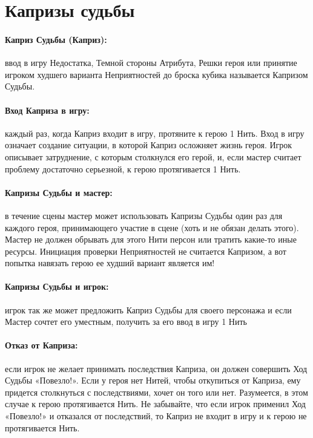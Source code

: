 \section{Капризы судьбы}
\paragraph{Каприз Судьбы (Каприз):} ввод в игру Недостатка, Темной стороны Атрибута, Решки героя или принятие игроком худшего варианта Неприятностей до броска кубика называется Капризом Судьбы.
\paragraph{Вход Каприза в игру:} каждый раз, когда Каприз входит в игру, протяните к герою 1 Нить. Вход в игру означает создание ситуации, в которой Каприз осложняет жизнь героя. Игрок описывает затруднение, с которым столкнулся его герой, и, если мастер считает проблему достаточно серьезной, к герою протягивается 1 Нить.
\paragraph{Капризы Судьбы и мастер:} в течение сцены мастер может использовать Капризы Судьбы один раз для каждого героя, принимающего участие в сцене (хоть и не обязан делать этого). Мастер не должен обрывать для этого Нити персон или тратить какие-то иные ресурсы. Инициация проверки Неприятностей не считается Капризом, а вот попытка навязать герою ее худший вариант является им!


\paragraph{Капризы Судьбы и игрок:} игрок так же может предложить Каприз Судьбы для своего персонажа и если Мастер сочтет его уместным, получить за его ввод в игру 1 Нить


\paragraph{Отказ от Каприза:} если игрок не желает принимать последствия Каприза, он должен совершить Ход Судьбы «Повезло!». Если у героя нет Нитей, чтобы откупиться от Каприза, ему придется столкнуться с последствиями, хочет он того или нет. Разумеется, в этом случае к герою протягивается Нить. Не забывайте, что если игрок применил Ход «Повезло!» и отказался от последствий, то Каприз не входит в игру и к герою не протягивается Нить.